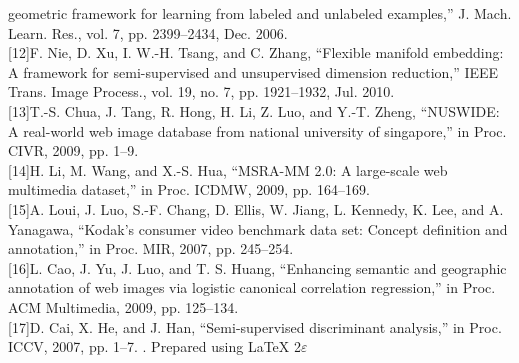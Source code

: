 \documentclass[a4paper,11pt]{report}
\begin{document}
geometric framework for learning from labeled and unlabeled examples,”
J. Mach. Learn. Res., vol. 7, pp. 2399–2434, Dec. 2006.\\[0.5cm]
[12]F. Nie, D. Xu, I. W.-H. Tsang, and C. Zhang, “Flexible manifold
embedding: A framework for semi-supervised and unsupervised
dimension reduction,” IEEE Trans. Image Process., vol. 19, no. 7, pp.
1921–1932, Jul. 2010.\\[0.5cm]
[13]T.-S. Chua, J. Tang, R. Hong, H. Li, Z. Luo, and Y.-T. Zheng, “NUSWIDE:
A real-world web image database from national university of
singapore,” in Proc. CIVR, 2009, pp. 1–9.\\[0.5cm]
[14]H. Li, M. Wang, and X.-S. Hua, “MSRA-MM 2.0: A large-scale web
multimedia dataset,” in Proc. ICDMW, 2009, pp. 164–169.\\[0.5cm]
[15]A. Loui, J. Luo, S.-F. Chang, D. Ellis, W. Jiang, L. Kennedy, K. Lee,
and A. Yanagawa, “Kodak’s consumer video benchmark data set: Concept
definition and annotation,” in Proc. MIR, 2007, pp. 245–254.\\[0.5cm]
[16]L. Cao, J. Yu, J. Luo, and T. S. Huang, “Enhancing semantic and geographic
annotation of web images via logistic canonical correlation
regression,” in Proc. ACM Multimedia, 2009, pp. 125–134.\\[0.5cm]
[17]D. Cai, X. He, and J. Han, “Semi-supervised discriminant analysis,” in
Proc. ICCV, 2007, pp. 1–7.
\newpage
\thispagestyle{empty}
\vfill
\fontsize{14}{15}\selectfont.
\vfill
\hfill
\fontsize{12}{15}\selectfont Prepared using \LaTeX \hspace{1pt} 2$\varepsilon$
\end{document}
